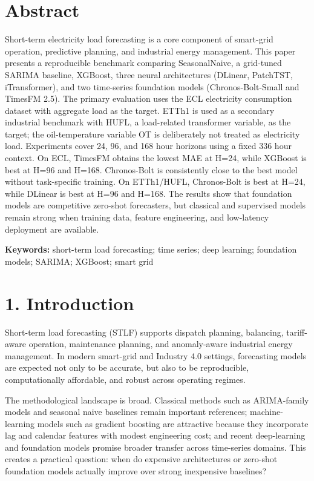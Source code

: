 \section{Abstract}\label{abstract}

Short-term electricity load forecasting is a core component of
smart-grid operation, predictive planning, and industrial energy
management. This paper presents a reproducible benchmark comparing
SeasonalNaive, a grid-tuned SARIMA baseline, XGBoost, three neural
architectures (DLinear, PatchTST, iTransformer), and two time-series
foundation models (Chronos-Bolt-Small and TimesFM 2.5). The primary
evaluation uses the ECL electricity consumption dataset with aggregate
load as the target. ETTh1 is used as a secondary industrial benchmark
with HUFL, a load-related transformer variable, as the target; the
oil-temperature variable OT is deliberately not treated as electricity
load. Experiments cover 24, 96, and 168 hour horizons using a fixed 336
hour context. On ECL, TimesFM obtains the lowest MAE at H=24, while
XGBoost is best at H=96 and H=168. Chronos-Bolt is consistently close to
the best model without task-specific training. On ETTh1/HUFL,
Chronos-Bolt is best at H=24, while DLinear is best at H=96 and H=168.
The results show that foundation models are competitive zero-shot
forecasters, but classical and supervised models remain strong when
training data, feature engineering, and low-latency deployment are
available.

\textbf{Keywords:} short-term load forecasting; time series; deep
learning; foundation models; SARIMA; XGBoost; smart grid

\section{1. Introduction}\label{introduction}

Short-term load forecasting (STLF) supports dispatch planning,
balancing, tariff-aware operation, maintenance planning, and
anomaly-aware industrial energy management. In modern smart-grid and
Industry 4.0 settings, forecasting models are expected not only to be
accurate, but also to be reproducible, computationally affordable, and
robust across operating regimes.

The methodological landscape is broad. Classical methods such as
ARIMA-family models and seasonal naive baselines remain important
references; machine-learning models such as gradient boosting are
attractive because they incorporate lag and calendar features with
modest engineering cost; and recent deep-learning and foundation models
promise broader transfer across time-series domains. This creates a
practical question: when do expensive architectures or zero-shot
foundation models actually improve over strong inexpensive baselines?


